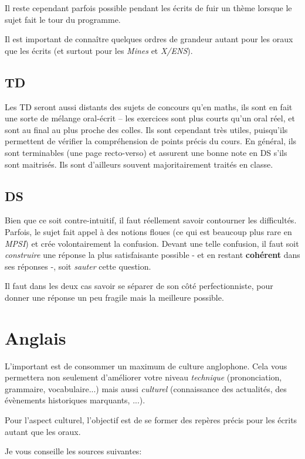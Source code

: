 \documentclass{article}
\begin{document}
Il reste cependant parfois possible pendant les écrits de fuir un thème lorsque le sujet fait le tour du programme.

Il est important de connaître quelques ordres de grandeur autant pour les oraux que les écrits (et surtout pour les \textit{Mines} et \textit{X/ENS}).

\subsection{TD}
Les TD seront aussi distants des sujets de concours qu'en maths, ils sont en fait une sorte de mélange oral-écrit -- les exercices sont plus courts qu'un oral réel, et sont au final au plus proche des colles.
Ils sont cependant très utiles, puisqu'ils permettent de vérifier la compréhension de points précis du cours.
En général, ils sont terminables (une page recto-verso) et assurent une bonne note en DS s'ils sont maitrisés.
Ils sont d'ailleurs souvent majoritairement traités en classe.

\subsection{DS}
Bien que ce soit contre-intuitif, il faut réellement savoir contourner les difficultés.
Parfois, le sujet fait appel à des notions floues (ce qui est beaucoup plus rare en \textit{MPSI}) et crée volontairement la confusion.
Devant une telle confusion, il faut soit \textit{construire} une réponse la plus satisfaisante possible - et en restant \textbf{cohérent} dans ses réponses -, soit \textit{sauter} cette question.

Il faut dans les deux cas savoir se séparer de son côté perfectionniste, pour donner une réponse un peu fragile mais la meilleure possible.

\section{Anglais}
L'important est de consommer un maximum de culture anglophone.
Cela vous permettera non seulement d'améliorer votre niveau \textit{technique} (prononciation, grammaire, vocabulaire...) mais aussi \textit{culturel} (connaissance des actualités, des évènements historiques marquants, ...).

Pour l'aspect culturel, l'objectif est de se former des repères précis pour les écrits autant que les oraux.

Je vous conseille les sources suivantes:
\end{document}

